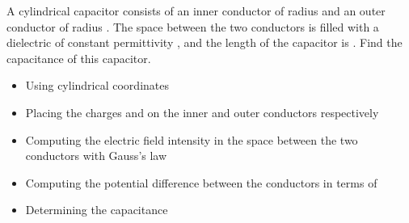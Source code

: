 \begin{ELexample}{}

A cylindrical capacitor consists of an inner conductor of radius  and an outer conductor of radius . The space between the two conductors is filled with a dielectric of constant permittivity \ELim{\epsilon}, and the length of the capacitor is . Find the capacitance of this capacitor.


\begin{ELsolution}

\begin{itemize}
\tightlist
\item
  Using cylindrical coordinates
\item
  Placing the charges  and  on the inner and outer conductors respectively
\item
  Computing the electric field intensity in the space between the two conductors with Gauss's law
\end{itemize}


\begin{itemize}
\tightlist
\item
  Computing the potential difference between the conductors in terms of 
\end{itemize}


\begin{itemize}
\tightlist
\item
  Determining the capacitance
\end{itemize}


\end{ELsolution}

\end{ELexample}


